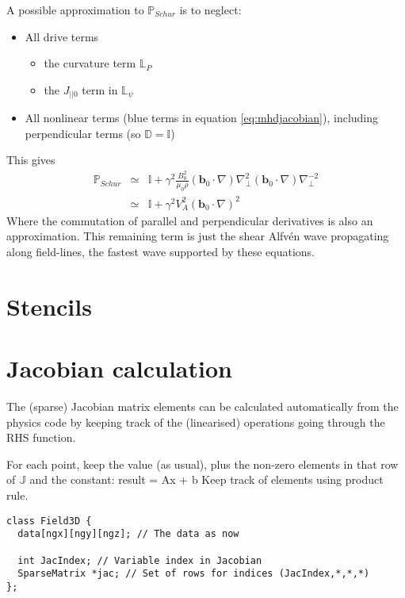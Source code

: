 \documentclass[12pt]{article}
\newcommand{\Vec}[1]{\ensuremath{\mathbf{#1}}}
\newcommand{\bvec}{\Vec{b}}
\newcommand{\delp}{\nabla_\perp^2}
\newcommand{\Jac}{\ensuremath{\mathbb{J}}}
\begin{document}
A possible approximation to $\mathbb{P}_{Schur}$ is to neglect:
\begin{itemize}
  \item All drive terms
    \begin{itemize}
    \item the curvature term $\mathbb{L}_P$
    \item the $J_{||0}$ term in $\mathbb{L}_\psi$
    \end{itemize}
  \item All nonlinear terms (blue terms in equation \ref{eq:mhdjacobian}), including perpendicular terms
    (so $\mathbb{D} = \mathbb{I}$)
\end{itemize}
This gives
\begin{eqnarray}
\mathbb{P}_{Schur} &\simeq& \mathbb{I} + \gamma^2 \frac{B_0^2}{\mu_0\rho}\left(\bvec_0\cdot\nabla\right)\delp\left(\bvec_0\cdot\nabla\right)\nabla_\perp^{-2} \nonumber \\
&\simeq& \mathbb{I} + \gamma^2 V_A^2 \left(\bvec_0\cdot\nabla\right)^2
\end{eqnarray}
Where the commutation of parallel and perpendicular derivatives is also an approximation. This
remaining term is just the shear Alfv\'en wave propagating along field-lines, the fastest wave supported by these equations.

\section{Stencils}

\section{Jacobian calculation}

The (sparse) Jacobian matrix elements can be calculated automatically
from the physics code by keeping track of the (linearised) operations
going through the RHS function.

For each point, keep the value (as usual), plus the non-zero elements in
that row of $\Jac$ and the constant: result = Ax + b
Keep track of elements using product rule.

\begin{lstlisting}
class Field3D {
  data[ngx][ngy][ngz]; // The data as now
  
  int JacIndex; // Variable index in Jacobian
  SparseMatrix *jac; // Set of rows for indices (JacIndex,*,*,*)
};
\end{lstlisting}
\end{document}
